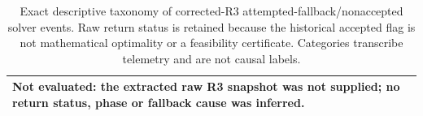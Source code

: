 \begin{table}[p]
\centering\scriptsize
\caption{Exact descriptive taxonomy of corrected-R3 attempted-fallback/nonaccepted solver events. Raw return status is retained because the historical accepted flag is not mathematical optimality or a feasibility certificate. Categories transcribe telemetry and are not causal labels.}
\label{tab:supervisor-feedback-failure-taxonomy}
\begin{tabular}{@{}l@{}}
\toprule
Not evaluated: the extracted raw R3 snapshot was not supplied; no return status, phase or fallback cause was inferred. \\
\bottomrule
\end{tabular}
\end{table}
